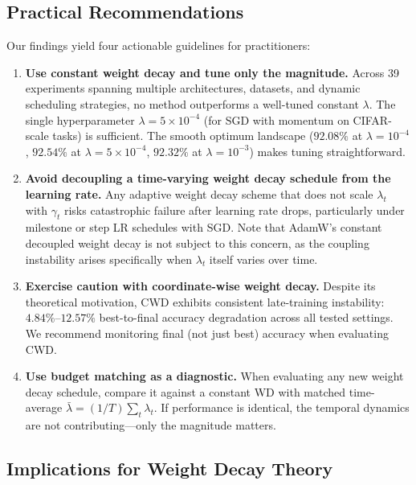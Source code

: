 \documentclass{article}
\begin{document}
\subsection{Practical Recommendations}

Our findings yield four actionable guidelines for practitioners:

\begin{enumerate}
  \item \textbf{Use constant weight decay and tune only the magnitude.}
        Across 39 experiments spanning multiple architectures, datasets, and dynamic
        scheduling strategies, no method outperforms a well-tuned constant $\lambda$.
        The single hyperparameter $\lambda = 5 \times 10^{-4}$ (for SGD with momentum
        on CIFAR-scale tasks) is sufficient.
        The smooth optimum landscape ($92.08\%$ at $\lambda = 10^{-4}$, $92.54\%$ at
        $\lambda = 5 \times 10^{-4}$, $92.32\%$ at $\lambda = 10^{-3}$) makes tuning
        straightforward.

  \item \textbf{Avoid decoupling a time-varying weight decay schedule from the
        learning rate.}
        Any adaptive weight decay scheme that does not scale $\lambda_t$ with
        $\gamma_t$ risks catastrophic failure after learning rate drops, particularly
        under milestone or step LR schedules with SGD.
        Note that AdamW's constant decoupled weight decay is not subject to this
        concern, as the coupling instability arises specifically when $\lambda_t$
        itself varies over time.

  \item \textbf{Exercise caution with coordinate-wise weight decay.}
        Despite its theoretical motivation, CWD \citep{liu2025cautious} exhibits
        consistent late-training instability:
        $4.84\%$--$12.57\%$ best-to-final accuracy degradation across all tested
        settings.
        We recommend monitoring final (not just best) accuracy when evaluating CWD.

  \item \textbf{Use budget matching as a diagnostic.}
        When evaluating any new weight decay schedule, compare it against a constant
        WD with matched time-average
        $\bar{\lambda} = (1/T)\sum_t \lambda_t$.
        If performance is identical, the temporal dynamics are not
        contributing---only the magnitude matters.
\end{enumerate}

\subsection{Implications for Weight Decay Theory}
\end{document}
